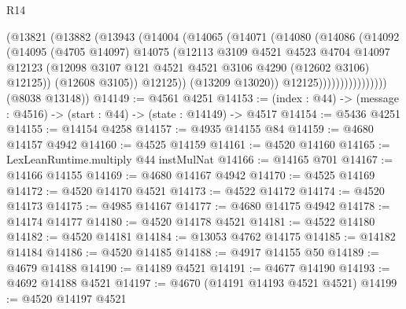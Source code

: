 \begin{lexlean}{R14}
\begin{coremodule}
                          (@13821
                            (@13882
                              (@13943
                                (@14004
                                  (@14065
                                    (@14071
                                      (@14080
                                        (@14086
                                          (@14092
                                            (@14095
                                              (@4705 @14097)
                                              @14075
                                              (@12113
                                                @3109
                                                @4521
                                                @4523
                                                @4704
                                                @14097
                                                @12123
                                                (@12098
                                                  @3107
                                                  @121
                                                  @4521
                                                  @4521
                                                  @3106
                                                  @4290
                                                  (@12602 @3106)
                                                  @12125))
                                              (@12608 @3105))
                                            @12125))
                                        (@13209 @13020))
                                      @12125))))))))))))))))
      (@8038 @13148))
@14149 := @4561 @4251
@14153 := (index : @44) -> (message : @4516) -> (start : @44) -> (state : @14149) -> @4517
@14154 := @5436 @4251
@14155 := @14154 @4258
@14157 := @4935 @14155 @84
@14159 := @4680 @14157 @4942
@14160 := @4525 @14159
@14161 := @4520 @14160
@14165 := LexLeanRuntime.multiply @44 instMulNat
@14166 := @14165 @701
@14167 := @14166 @14155
@14169 := @4680 @14167 @4942
@14170 := @4525 @14169
@14172 := @4520 @14170 @4521
@14173 := @4522 @14172
@14174 := @4520 @14173
@14175 := @4985 @14167
@14177 := @4680 @14175 @4942
@14178 := @14174 @14177
@14180 := @4520 @14178 @4521
@14181 := @4522 @14180
@14182 := @4520 @14181
@14184 := @13053 @4762 @14175
@14185 := @14182 @14184
@14186 := @4520 @14185
@14188 := @4917 @14155 @50
@14189 := @4679 @14188
@14190 := @14189 @4521
@14191 := @4677 @14190
@14193 := @4692 @14188 @4521
@14197 := @4670 (@14191 @14193 @4521 @4521)
@14199 := @4520 @14197 @4521

\end{coremodule}
\end{lexlean}
